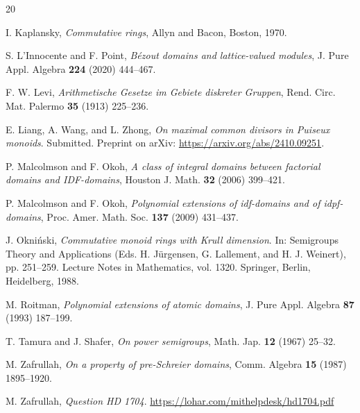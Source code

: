 \documentclass[10pt]{amsart}
\theoremstyle{definition}
\theoremstyle{remark}
\numberwithin{equation}{section}
\begin{document}
\begin{thebibliography}{20}


 I. Kaplansky, \emph{Commutative rings}, Allyn and Bacon, Boston, 1970.

 S. L'Innocente and F. Point, \emph{Bézout domains and lattice-valued modules}, J. Pure Appl. Algebra \textbf{224} (2020) 444--467.

 F. W. Levi, \emph{Arithmetische Gesetze im Gebiete diskreter Gruppen}, Rend. Circ. Mat. Palermo \textbf{35} (1913) 225--236.

 E. Liang, A. Wang, and L. Zhong, \emph{On maximal common divisors in Puiseux monoids}. Submitted. Preprint on arXiv: \url{https://arxiv.org/abs/2410.09251}.

 P. Malcolmson and F. Okoh, \emph{A class of integral domains between factorial domains and IDF-domains}, Houston J. Math. \textbf{32} (2006) 399--421.

 P. Malcolmson and F. Okoh, \emph{Polynomial extensions of idf-domains and of idpf-domains}, Proc. Amer. Math. Soc. \textbf{137} (2009) 431--437.

 J. Okni\'nski, \emph{Commutative monoid rings with Krull dimension}. In: Semigroups Theory and Applications (Eds. H. J\"urgensen, G. Lallement, and H. J. Weinert), pp. 251--259. Lecture Notes in Mathematics, vol. 1320. Springer, Berlin, Heidelberg, 1988.

 M. Roitman, \emph{Polynomial extensions of atomic domains}, J. Pure Appl. Algebra \textbf{87} (1993) 187--199.

 T. Tamura and J. Shafer, \emph{On power semigroups}, Math. Jap. \textbf{12} (1967) 25--32.

 M. Zafrullah, \emph{On a property of pre-Schreier domains}, Comm. Algebra \textbf{15} (1987) 1895--1920.

 M. Zafrullah, \emph{Question HD 1704}. \url{https://lohar.com/mithelpdesk/hd1704.pdf}

\end{thebibliography}
\end{document}
